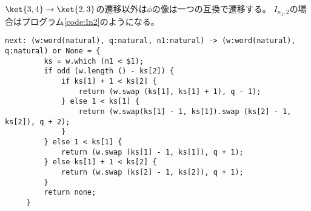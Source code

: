 {\begin{todo}[修正その二]\label{todo:修正その二} %
\end{todo} %
	$\ket{3,4}\to\ket{2,3}$の遷移以外は$\phi$の像は一つの互換で遷移する。
	$I_{n_1,2}$の場合はプログラム\ref{code:In2}のようになる。

	\begin{lstlisting}[caption=$I_{n_1,2}$, label=code:In2]
	 next: (w:word(natural), q:natural, n1:natural) -> (w:word(natural), q:natural) or None = {
		 ks = w.which (n1 < $1);
		 if odd (w.length () - ks[2]) {
			 if ks[1] + 1 < ks[2] {
				 return (w.swap (ks[1], ks[1] + 1), q - 1);
			 } else 1 < ks[1] {
				 return (w.swap(ks[1] - 1, ks[1]).swap (ks[2] - 1, ks[2]), q + 2);
			 }
		 } else 1 < ks[1] {
			 return (w.swap (ks[1] - 1, ks[1]), q + 1);
		 } else ks[1] + 1 < ks[2] {
			 return (w.swap (ks[2] - 1, ks[2]), q + 1);
		 }
		 return none;
	 }
	\end{lstlisting}

}

